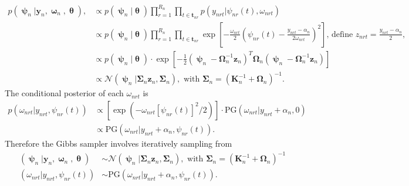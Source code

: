 \documentclass[11pt]{article}
\newcommand{\pN}{\mathcal{N}}
\newcommand{\1}{\mathbf{1}}
\newcommand{\0}{\mathbf{0}}
\newcommand{\K}{\mathbf{K}}
\newcommand{\y}{\mathbf{y}}
\begin{document}
\begin{align*}
	p(\bm{\uppsi}_{n} | \y_{n}, \bm{\upomega}_{n}, \bm{\uptheta}),  &\propto p(\bm{\uppsi}_n | \bm{\uptheta}) \prod_{r=1}^{R_n} \prod_{t\in\mathbf{t}_{nr}} p(y_{nrt} | \psi_{nr}(t), \omega_{nrt}) \\%
	 &\propto p(\bm{\uppsi}_n | \bm{\uptheta}) \prod_{r=1}^{R_n} \prod_{t\in\mathbf{t}_{nr}} \exp\left[ -\frac{\omega_{nrt}}{2}\left( \psi_{nr}(t) - \frac{y_{nrt} - \alpha_{n}}{2 \omega_{nrt}} \right)^2 \right] \text{, define } z_{nrt} = \frac{y_{nrt} - \alpha_{n}}{2 }, \\
	&\propto p(\bm{\uppsi}_{n} | \bm{\uptheta}) \cdot \exp \left[ -\frac{1}{2} \left( \bm{\uppsi}_{n} - \bm{\Omega}^{-1}_{n} \mathbf{z}_n \right)^T \bm{\Omega}_{n} \left( \bm{\uppsi}_{n} - \bm{\Omega}_{n}^{-1} \mathbf{z}_n \right) \right] \\
	&\propto \pN \left(\bm{\uppsi}_{n} | \bm{\Sigma}_{n} \mathbf{z}_n, \bm{\Sigma}_{n}  \right), \text{ with } \bm{\Sigma}_{n} = \left( \K_n^{-1} + \bm{\Omega}_{n} \right)^{-1}.
\end{align*}
%
%
%
%
The conditional posterior of each $\omega_{nrt}$ is 
%
%
%
\begin{align*}
	p(\omega_{nrt} | y_{nrt}, \psi_{nr}(t)) &\propto \left[ \exp\left( -\omega_{nrt}\left[ \psi_{nr}(t) \right]^2 / 2 \right) \right] \cdot \text{PG}(\omega_{nrt} | y_{nrt} + \alpha_{n}, 0) \\
	&\propto \text{PG}(\omega_{nrt} | y_{nrt} + \alpha_{n}, \psi_{nr}(t)).
\end{align*}
%
%
%
Therefore the Gibbs sampler involves iteratively sampling from 
%
%
%
\begin{align}
	 (\bm{\uppsi}_{n} | \y_{n}, \bm{\upomega}_{n}, \bm{\uptheta}) &\sim \pN \left(\bm{\uppsi}_{n} | \bm{\Sigma}_{n} \mathbf{z}_n, \bm{\Sigma}_{n}  \right), \text{ with } \bm{\Sigma}_{n} = \left( \K_n^{-1} + \bm{\Omega}_{n} \right)^{-1} \\
	(\omega_{nrt} | y_{nrt}, \psi_{nr}(t)) &\sim \text{PG}(\omega_{nrt} | y_{nrt} + \alpha_{n}, \psi_{nr}(t)).
\end{align}
%
%
%
\end{document}

